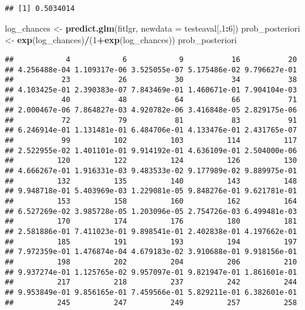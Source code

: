 \documentclass[]{article}
\newenvironment{Shaded}{\begin{snugshade}}{\end{snugshade}}
\newcommand{\KeywordTok}[1]{\textcolor[rgb]{0.13,0.29,0.53}{\textbf{#1}}}
\newcommand{\DataTypeTok}[1]{\textcolor[rgb]{0.13,0.29,0.53}{#1}}
\newcommand{\DecValTok}[1]{\textcolor[rgb]{0.00,0.00,0.81}{#1}}
\newcommand{\StringTok}[1]{\textcolor[rgb]{0.31,0.60,0.02}{#1}}
\newcommand{\OperatorTok}[1]{\textcolor[rgb]{0.81,0.36,0.00}{\textbf{#1}}}
\newcommand{\NormalTok}[1]{#1}
\begin{document}
\begin{verbatim}
## [1] 0.5034014
\end{verbatim}

\begin{Shaded}
\begin{Highlighting}[]
\NormalTok{log_chances <-}\StringTok{ }\KeywordTok{predict.glm}\NormalTok{(fitlgr, }\DataTypeTok{newdata =}\NormalTok{ testeaval[,}\DecValTok{1}\OperatorTok{:}\DecValTok{6}\NormalTok{])}
\NormalTok{prob_posteriori <-}\StringTok{ }\KeywordTok{exp}\NormalTok{(log_chances)}\OperatorTok{/}\NormalTok{(}\DecValTok{1}\OperatorTok{+}\KeywordTok{exp}\NormalTok{(log_chances))}
\NormalTok{prob_posteriori}
\end{Highlighting}
\end{Shaded}

\begin{verbatim}
##            4            6            9           16           20 
## 4.256488e-04 1.109317e-06 3.525055e-07 5.175486e-02 9.796627e-01 
##           23           26           30           34           38 
## 4.103425e-01 2.390383e-07 7.843469e-01 1.460671e-01 7.904104e-03 
##           40           48           64           66           71 
## 2.000467e-06 7.864827e-03 4.920782e-06 3.416848e-05 2.829175e-06 
##           72           79           81           83           91 
## 6.246914e-01 1.131481e-01 6.484706e-01 4.133476e-01 2.431765e-07 
##           99          102          103          114          117 
## 2.522955e-02 1.401101e-01 9.914192e-01 4.636109e-01 2.504000e-06 
##          120          122          124          126          130 
## 4.666267e-01 1.916331e-03 9.483533e-02 9.177989e-02 9.889975e-01 
##          132          135          140          143          148 
## 9.948718e-01 5.403969e-03 1.229081e-05 9.848276e-01 9.621781e-01 
##          153          158          160          162          164 
## 6.527269e-02 3.985728e-05 1.203096e-05 2.754726e-03 6.499481e-03 
##          170          174          176          180          181 
## 2.581886e-01 7.411023e-01 9.898541e-01 2.402838e-01 4.197662e-01 
##          185          191          193          194          197 
## 7.972359e-01 1.476874e-04 4.679183e-02 3.910688e-01 9.918156e-01 
##          198          202          204          206          210 
## 9.937274e-01 1.125765e-02 9.957097e-01 9.821947e-01 1.861601e-01 
##          217          218          237          242          244 
## 9.953849e-01 9.856165e-01 7.459566e-01 5.829211e-01 6.382601e-01 
##          245          247          249          257          258 

\end{verbatim}
\end{document}
